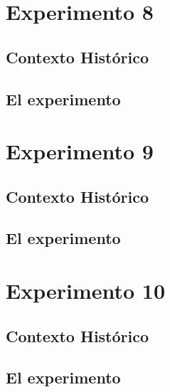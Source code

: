 \documentclass[journal]{IEEEtran}
\begin{document}
\hfill \break
\section{Experimento 8}

\subsection{Contexto Histórico}

\subsection{El experimento}







\hfill \break
\section{Experimento 9}

\subsection{Contexto Histórico}

\subsection{El experimento}








\hfill \break
\section{Experimento 10}

\subsection{Contexto Histórico}

\subsection{El experimento}










\end{document}
